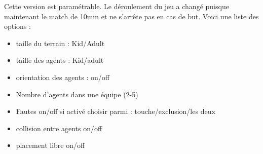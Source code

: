 \documentclass[11pt, a4paper]{article}
\begin{document}
Cette version est paramétrable. Le déroulement du jeu a changé puisque maintenant le match de 10min et ne s'arrête pas en cas de but.
Voici une liste des options :
	\begin{itemize}
		\item taille du terrain : Kid/Adult
		\item taille des agents : Kid/adult
		\item orientation des agents : on/off
		\item Nombre d'agents dans une équipe (2-5)
		\item Fautes on/off si activé choisir parmi : touche/exclusion/les deux
		\item collision entre agents on/off
		\item placement libre on/off
	
		
	\end{itemize}
\end{document}
